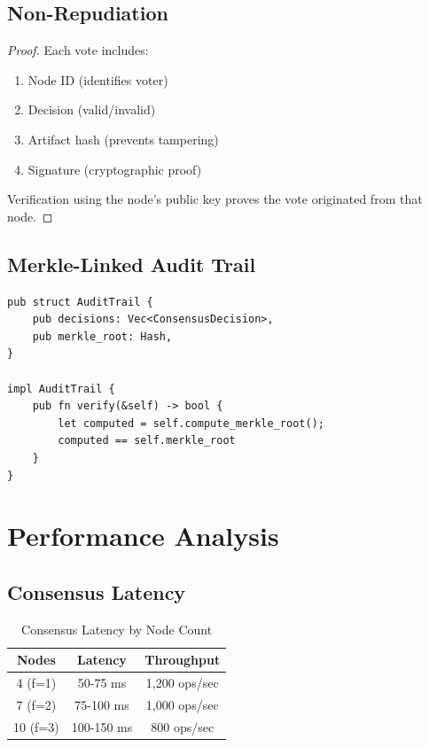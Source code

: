\subsection{Non-Repudiation}

\begin{theorem}[Decision Non-Repudiation]}
    A node cannot deny having voted for a decision.
\end{theorem}

\begin{proof}
    Each vote includes:
    \begin{enumerate}
        \item Node ID (identifies voter)
        \item Decision (valid/invalid)
        \item Artifact hash (prevents tampering)
        \item Signature (cryptographic proof)
    \end{enumerate}
    Verification using the node's public key proves the vote originated from that node.
\end{proof}

\subsection{Merkle-Linked Audit Trail}

\begin{verbatim}
pub struct AuditTrail {
    pub decisions: Vec<ConsensusDecision>,
    pub merkle_root: Hash,
}

impl AuditTrail {
    pub fn verify(&self) -> bool {
        let computed = self.compute_merkle_root();
        computed == self.merkle_root
    }
}
\end{verbatim}

\section{Performance Analysis}

\subsection{Consensus Latency}

\begin{table}[h]
\centering
\caption{Consensus Latency by Node Count}
\begin{tabular}{ccc}
\toprule
\textbf{Nodes} & \textbf{Latency} & \textbf{Throughput} \\
\midrule
4 (f=1) & 50-75 ms & 1,200 ops/sec \\
7 (f=2) & 75-100 ms & 1,000 ops/sec \\
10 (f=3) & 100-150 ms & 800 ops/sec \\
\bottomrule
\end{tabular}
\end{table}

